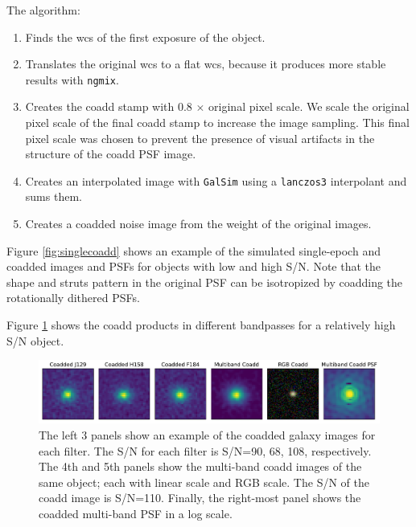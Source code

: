 \documentclass[fleqn,usenatbib]{mnras}
\begin{document}
The algorithm: 
\begin{enumerate}
    \setlength\itemsep{1em}
    \item Finds the wcs of the first exposure of the object.
    \item Translates the original wcs to a flat wcs, because it produces more stable results with \texttt{ngmix}.
    \item Creates the coadd stamp with 0.8 $\times$ original pixel scale. We scale the original pixel scale of the final coadd stamp to increase the image sampling. This final pixel scale was chosen to prevent the presence of visual artifacts in the structure of the coadd PSF image. 
    \item Creates an interpolated image with \texttt{GalSim}  using a \texttt{lanczos3} interpolant and sums them. 
    \item Creates a coadded noise image from the weight of the original images. 
\end{enumerate}
Figure \ref{fig:singlecoadd} shows an example of the simulated single-epoch and coadded images and PSFs for objects with low and high S/N. Note that the shape and struts pattern in the original PSF can be isotropized by coadding the rotationally dithered PSFs. 


Figure \ref{fig:single_to_coadd_rgb} shows the coadd products in different bandpasses for a relatively high S/N object.



\begin{figure}
	\includegraphics[width=\textwidth]{coadd_galaxy_example_log_v2.pdf}
    \caption{The left 3 panels show an example of the coadded galaxy images for each filter. The S/N for each filter is S/N=90, 68, 108, respectively. The 4th and 5th panels show the multi-band coadd images of the same object; each with linear scale and RGB scale. The S/N of the coadd image is S/N=110. Finally, the right-most panel shows the coadded multi-band PSF in a log scale.}
    \label{fig:single_to_coadd_rgb}
\end{figure}
\end{document}
